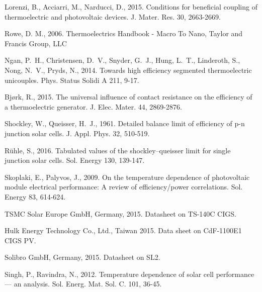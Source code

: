 \documentclass[fleqn,10pt]{SelfArx} %
\begin{document}
\begin{thebibliography}{}
Lorenzi, B., Acciarri, M., Narducci, D., 2015. Conditions for beneficial coupling of thermoelectric and photovoltaic devices. J. Mater. Res. 30, 2663-2669.

Rowe, D. M., 2006. Thermoelectrics Handbook - Macro To Nano, Taylor and Francis Group, LLC

Ngan, P.~H., Christensen, D.~V., Snyder, G.~J., Hung, L.~T., Linderoth, S., Nong, N.~V., Pryds, N., 2014. Towards high efficiency segmented thermoelectric unicouples. Phys. Status Solidi A 211, 9-17.

Bj{\o}rk, R., 2015. The universal influence of contact resistance on the efficiency of a thermoelectric generator. J. Elec. Mater. 44, 2869-2876.

Shockley, W., Queisser, H.~J., 1961. Detailed balance limit of efficiency of p-n junction solar cells. J. Appl. Phys. 32, 510-519.

R{\"u}hle, S., 2016. Tabulated values of the shockley--queisser limit for single junction solar cells. Sol. Energy 130, 139-147.

Skoplaki, E., Palyvos, J., 2009. On the temperature dependence of photovoltaic module electrical performance: A review of efficiency/power correlations. Sol. Energy 83, 614-624.

TSMC Solar Europe GmbH, Germany, 2015. Datasheet on TS-140C CIGS.

Hulk Energy Technology Co., Ltd., Taiwan 2015. Data sheet on CdF-1100E1 CIGS PV.

Solibro GmbH, Germany, 2015. Datasheet on SL2.

Singh, P., Ravindra, N., 2012. Temperature dependence of solar cell performance — an analysis. Sol. Energ. Mat. Sol. C. 101, 36-45.
\end{thebibliography}
\end{document}
